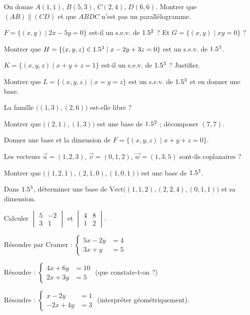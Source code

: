 \exo{} On donne $A(1,1)$, $B(5,3)$, $C(2,4)$, $D(6,6)$. Montrer que $(AB)\parallel(CD)$ et
que $ABDC$ n'est pas un parallélogramme.

\exo{} $F=\{(x,y)\mid 2x-5y=0\}$ est-il un s.e.v. de $1.5^2$ ? Et $G=\{(x,y)\mid xy=0\}$ ?

\exo{} Montrer que $H=\{(x,y,z)\in1.5^3\mid x-2y+3z=0\}$ est un s.e.v. de $1.5^3$.

\exo{} $K=\{(x,y,z)\mid x+y+z=1\}$ est-il un s.e.v. de $1.5^3$ ? Justifier.

\exo{} Montrer que $L=\{(x,y,z)\mid x=y=z\}$ est un s.e.v. de $1.5^3$ et en donner une base.

\exo{} La famille $\big((1,3),(2,6)\big)$ est-elle libre ?

\exo{} Montrer que $\big((2,1),(1,3)\big)$ est une base de $1.5^2$ ; décomposer $(7,7)$.

\exo{} Donner une base et la dimension de $F=\{(x,y,z)\mid x+y+z=0\}$.

\exo{} Les vecteurs $\vec u=(1,2,3)$, $\vec v=(0,1,2)$, $\vec w=(1,3,5)$ sont-ils
coplanaires ?

\exo{} Montrer que $\big((1,2,1),(2,1,0),(1,0,1)\big)$ est une base de $1.5^3$.

\exo{} Dans $1.5^3$, déterminer une base de $\mathrm{Vect}\big((1,1,2),(2,2,4),(0,1,1)\big)$
et sa dimension.

\exo{} Calculer $\begin{vmatrix}5&-2\\3&1\end{vmatrix}$ et $\begin{vmatrix}4&8\\1&2\end{vmatrix}$.

\exo{} Résoudre par Cramer : $\left\{\begin{aligned}5x-2y&=4\\ 3x+y&=5\end{aligned}\right.$

\exo{} Résoudre : $\left\{\begin{aligned}4x+6y&=10\\ 2x+3y&=5\end{aligned}\right.$
(que constate-t-on ?)

\exo{} Résoudre : $\left\{\begin{aligned}x-2y&=1\\ -2x+4y&=3\end{aligned}\right.$
(interpréter géométriquement).

